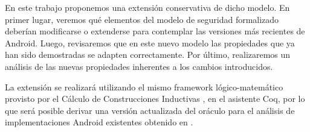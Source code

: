 En este trabajo proponemos una extensión conservativa de dicho modelo. En primer
lugar, veremos qué elementos del modelo de seguridad formalizado deberían
modificarse o extenderse para contemplar las versiones más recientes de Android.
Luego, revisaremos que en este nuevo modelo las propiedades que ya han sido
demostradas se adapten correctamente. Por último, realizaremos un análisis de
las nuevas propiedades inherentes a los cambios introducidos.

La extensión se realizará utilizando el mismo framework lógico-matemático
provisto por el Cálculo de Construcciones Inductivas \cite{coqart, coquand:88},
en el asistente Coq, por lo que será posible derivar una versión actualizada del
oráculo para el análisis de implementaciones Android existentes obtenido en
\cite{fgorostiaga}.